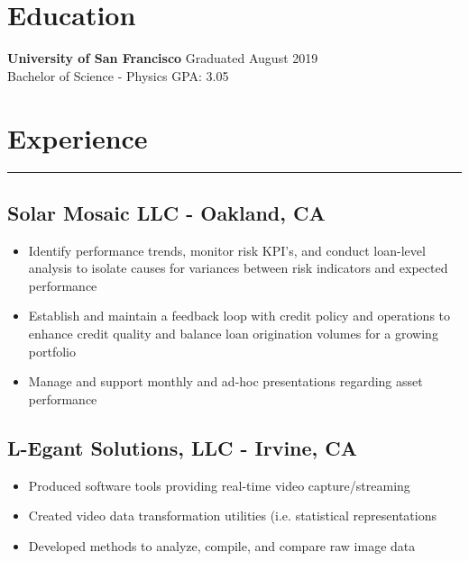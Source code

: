 \documentclass[11pt,a4paper]{article}
\newenvironment{myitemize}
{ \begin{itemize}[label={--}, leftmargin=*]
    \setlength{\itemsep}{0pt}
    \setlength{\parskip}{0pt}
    \setlength{\parsep}{0pt}     }
{ \end{itemize}                  }
\begin{document}
\section*{Education}
\vspace{-6.5mm} %
\noindent\makebox[\linewidth]{\rule{\textwidth}{0.4pt}}
\textbf{University of San Francisco} \hfill Graduated August 2019 \\
Bachelor of Science - Physics \hfill GPA: 3.05



\section*{Experience}
\vspace{-3mm} %
\hrule
\vspace{3mm} %

\subsection*{Solar Mosaic LLC - Oakland, CA \hfill {} }

\begin{myitemize}
\item Identify performance trends, monitor risk KPI’s, and conduct loan-level analysis to isolate causes for variances between risk indicators and expected performance
\item Establish and maintain a feedback loop with credit policy and operations to enhance credit quality and balance loan origination volumes for a growing portfolio
\item Manage and support monthly and ad-hoc presentations regarding asset performance
\end{myitemize}

\subsection*{L-Egant Solutions, LLC - Irvine, CA \hfill {} }

\begin{myitemize}
\item Produced software tools providing real-time video capture/streaming
\item Created video data transformation utilities (i.e. statistical representations
\item Developed methods to analyze, compile, and compare raw image data 

\end{myitemize}
\end{document}
